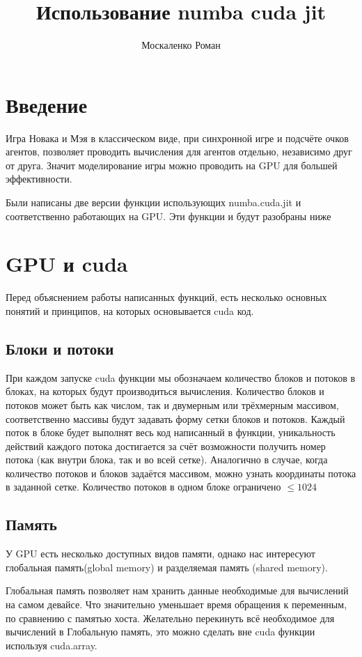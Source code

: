 \documentclass[a4paper,12pt]{article}
\title{Использование numba cuda jit}
\author{Москаленко Роман}
\date{}
\begin{document}
\maketitle

\section{Введение}
Игра Новака и Мэя в классическом виде, при синхронной игре и подсчёте очков агентов, позволяет проводить вычисления для агентов отдельно, независимо друг от друга. Значит моделирование игры можно проводить на GPU для большей эффективности. 

Были написаны две версии функции использующих numba.cuda.jit и соответственно работающих на GPU. Эти функции и будут разобраны ниже

\section{GPU и cuda}

Перед объяснением работы написанных функций, есть несколько основных понятий и принципов, на которых основывается cuda код.

\subsection{Блоки и потоки}

При каждом запуске cuda функции мы обозначаем количество блоков и потоков в блоках, на которых будут производиться вычисления.  Количество блоков и потоков может быть как числом, так и двумерным или трёхмерным массивом, соответственно массивы будут задавать форму сетки блоков и потоков. Каждый поток в блоке будет выполнят весь код написанный в функции, уникальность действий каждого потока достигается за счёт возможности получить номер потока (как внутри блока, так и во всей сетке). Аналогично в случае, когда количество потоков и блоков задаётся массивом, можно узнать координаты потока в заданной сетке. Количество потоков в одном блоке ограничено $\le 1024$

\subsection{Память}

У GPU есть несколько доступных видов памяти, однако нас интересуют глобальная память(global memory) и разделяемая память (shared memory).

Глобальная память позволяет нам хранить данные необходимые для вычислений на самом девайсе. Что значительно уменьшает время обращения к переменным, по сравнению с памятью хоста. Желательно перекинуть всё необходимое для вычислений в Глобальную память, это можно сделать вне cuda функции используя cuda.array.
\end{document}
